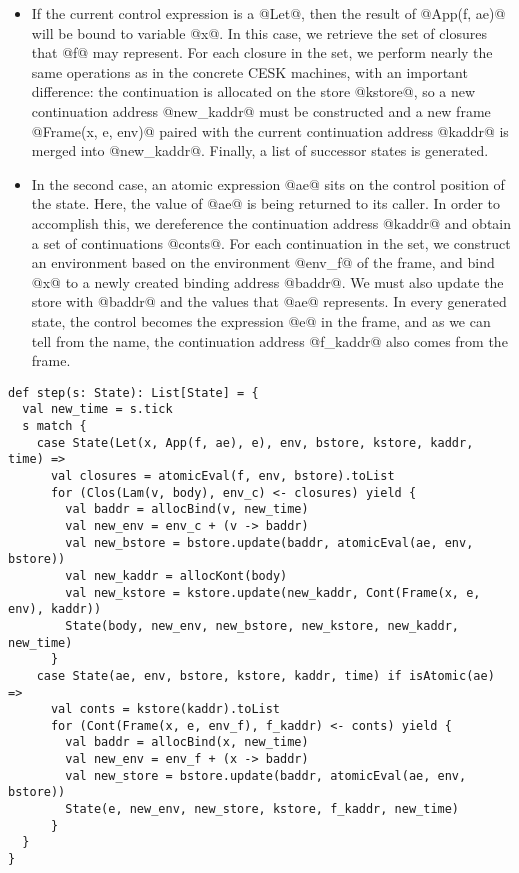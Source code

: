 \documentclass[acmsmall]{acmart}\settopmatter{}
\begin{document}
\begin{itemize}
  \item If the current control expression is a @Let@, then the result of @App(f, ae)@ will 
    be bound to variable @x@. In this case, we retrieve the set of closures that @f@ may 
    represent. For each closure in the set, we perform nearly the same operations as in the
    concrete CESK machines, with an important difference: the continuation is allocated on 
    the store @kstore@, so a new continuation address @new_kaddr@ must be constructed and 
    a new frame @Frame(x, e, env)@ paired with the current continuation address @kaddr@ is 
    merged into @new_kaddr@. Finally, a list of successor states is generated.

  \item In the second case, an atomic expression @ae@ sits on the control position of the
    state. Here, the value of @ae@ is being returned to its caller.
    In order to accomplish this, we dereference the continuation address @kaddr@ and obtain 
    a set of continuations @conts@. For each continuation in the set, we construct an 
    environment based on the environment @env_f@ of the frame, and bind @x@ to a newly 
    created binding address @baddr@. We must also update the store with @baddr@ and the 
    values that @ae@ represents. In every generated state, the control becomes the expression 
    @e@ in the frame, and as we can tell from the name, the continuation address @f_kaddr@ 
    also comes from the frame.
\end{itemize}

\begin{lstlisting}
def step(s: State): List[State] = {
  val new_time = s.tick
  s match {
    case State(Let(x, App(f, ae), e), env, bstore, kstore, kaddr, time) =>
      val closures = atomicEval(f, env, bstore).toList
      for (Clos(Lam(v, body), env_c) <- closures) yield {
        val baddr = allocBind(v, new_time)
        val new_env = env_c + (v -> baddr)
        val new_bstore = bstore.update(baddr, atomicEval(ae, env, bstore))
        val new_kaddr = allocKont(body)
        val new_kstore = kstore.update(new_kaddr, Cont(Frame(x, e, env), kaddr))
        State(body, new_env, new_bstore, new_kstore, new_kaddr, new_time)
      }
    case State(ae, env, bstore, kstore, kaddr, time) if isAtomic(ae) =>
      val conts = kstore(kaddr).toList
      for (Cont(Frame(x, e, env_f), f_kaddr) <- conts) yield {
        val baddr = allocBind(x, new_time)
        val new_env = env_f + (x -> baddr)
        val new_store = bstore.update(baddr, atomicEval(ae, env, bstore))
        State(e, new_env, new_store, kstore, f_kaddr, new_time)
      }
  }
}
\end{lstlisting}
\end{document}
